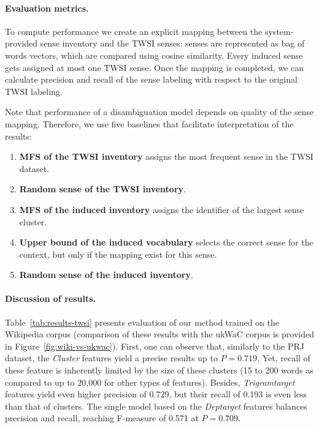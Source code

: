 \documentclass[11pt]{article}
\newenvironment{enumerate2}
    {\begin{enumerate}
        \vspace{-0.1em}
        \setlength{\abovedisplayskip}{0pt}
        \setlength{\belowdisplayskip}{0pt}
        \setlength{\itemsep}{5pt}
        \setlength{\parskip}{0pt}
        \setlength{\parsep}{0pt}
        \setlength{\topsep}{0pt}
        \setlength{\partopsep}{0pt}
    }
    {\vspace{-0.1em}
    \end{enumerate}}
\begin{document}
\paragraph{Evaluation metrics.}
To compute performance we create an explicit mapping between the system-provided sense inventory and the TWSI  senses: senses are represented as bag of words vectors, which are compared using cosine similarity. Every induced sense gets assigned at most one TWSI sense. Once the mapping is completed, we can calculate precision and recall of the sense labeling with respect to the original TWSI labeling.

Note that performance of a disambiguation model depends on quality of the sense mapping. Therefore, we use five baselines that facilitate interpretation of the results: 
\begin{enumerate2}
\item \textbf{MFS of the TWSI inventory} assigns the most frequent sense in the TWSI dataset. 
\item \textbf{Random sense of the TWSI inventory}.
\item \textbf{MFS of the induced inventory} assigns the identifier of the largest sense cluster.
\item \textbf{Upper bound of the induced vocabulary} selects the correct sense for the context, but only if the mapping exist for this sense. %
\item \textbf{Random sense of the induced inventory}. %
\end{enumerate2}



\paragraph{Discussion of results.}

Table~\ref{tab:results-twsi} presents evaluation of our method trained on the Wikipedia corpus  (comparison of these results with the ukWaC corpus is provided in Figure~\ref{fig:wiki-vs-ukwac}). 
First, one can observe that, similarly to the PRJ dataset, the \textit{Cluster} features yield a precise results up to $P=0.719$. Yet, recall of these feature is inherently limited by the size of these clusters (15 to 200 words as compared to up to 20,000 for other types of features). Besides, \textit{Trigramtarget} features yield even higher precision of 0.729, but their recall of 0.193 is even less than that of clusters. The single model based on the \textit{Deptarget} features balances precision and recall, reaching F-measure of 0.571 at $P=0.709$. 
\end{document}
